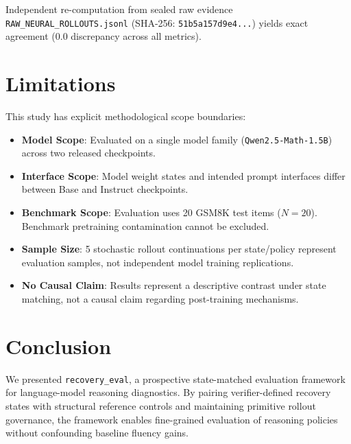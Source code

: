 \documentclass[conference]{IEEEtran}
\begin{document}
Independent re-computation from sealed raw evidence \texttt{RAW\_NEURAL\_ROLLOUTS.jsonl} (SHA-256: \texttt{51b5a157d9e4...}) yields exact agreement ($0.0$ discrepancy across all metrics).

\section{Limitations}
This study has explicit methodological scope boundaries:
\begin{itemize}
    \item \textbf{Model Scope}: Evaluated on a single model family (\texttt{Qwen2.5-Math-1.5B}) across two released checkpoints.
    \item \textbf{Interface Scope}: Model weight states and intended prompt interfaces differ between Base and Instruct checkpoints.
    \item \textbf{Benchmark Scope}: Evaluation uses 20 GSM8K test items ($N=20$). Benchmark pretraining contamination cannot be excluded.
    \item \textbf{Sample Size}: 5 stochastic rollout continuations per state/policy represent evaluation samples, not independent model training replications.
    \item \textbf{No Causal Claim}: Results represent a descriptive contrast under state matching, not a causal claim regarding post-training mechanisms.
\end{itemize}

\section{Conclusion}
We presented \texttt{recovery\_eval}, a prospective state-matched evaluation framework for language-model reasoning diagnostics. By pairing verifier-defined recovery states with structural reference controls and maintaining primitive rollout governance, the framework enables fine-grained evaluation of reasoning policies without confounding baseline fluency gains.



\end{document}
